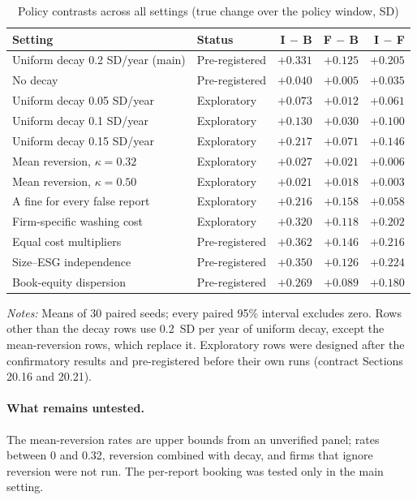 \documentclass[11pt]{article}
\begin{document}
\begin{table}[t]
\centering
\small
\begin{threeparttable}
\caption{Policy contrasts across all settings (true change over the policy window, SD)}
\label{tab:robust}
\begin{tabular}{@{}llrrr@{}}
\toprule
Setting & Status & I $-$ B & F $-$ B & I $-$ F \\
\midrule
Uniform decay 0.2 SD/year (main) & Pre-registered & $+0.331$ & $+0.125$ & $+0.205$ \\
No decay & Pre-registered & $+0.040$ & $+0.005$ & $+0.035$ \\
Uniform decay 0.05 SD/year & Exploratory & $+0.073$ & $+0.012$ & $+0.061$ \\
Uniform decay 0.1 SD/year & Exploratory & $+0.130$ & $+0.030$ & $+0.100$ \\
Uniform decay 0.15 SD/year & Exploratory & $+0.217$ & $+0.071$ & $+0.146$ \\
Mean reversion, $\kappa = 0.32$ & Exploratory & $+0.027$ & $+0.021$ & $+0.006$ \\
Mean reversion, $\kappa = 0.50$ & Exploratory & $+0.021$ & $+0.018$ & $+0.003$ \\
A fine for every false report & Exploratory & $+0.216$ & $+0.158$ & $+0.058$ \\
Firm-specific washing cost & Exploratory & $+0.320$ & $+0.118$ & $+0.202$ \\
Equal cost multipliers & Pre-registered & $+0.362$ & $+0.146$ & $+0.216$ \\
Size--ESG independence & Pre-registered & $+0.350$ & $+0.126$ & $+0.224$ \\
Book-equity dispersion & Pre-registered & $+0.269$ & $+0.089$ & $+0.180$ \\
\bottomrule
\end{tabular}
\begin{tablenotes}[flushleft]\footnotesize
\item \textit{Notes:} Means of 30 paired seeds; every paired 95\% interval excludes zero. Rows other than the decay rows use 0.2~SD per year of uniform decay, except the mean-reversion rows, which replace it. Exploratory rows were designed after the confirmatory results and pre-registered before their own runs (contract Sections 20.16 and 20.21).
\end{tablenotes}
\end{threeparttable}
\end{table}

\paragraph{What remains untested.} The mean-reversion rates are upper bounds from an unverified panel; rates between 0 and 0.32, reversion combined with decay, and firms that ignore reversion were not run. The per-report booking was tested only in the main setting.
\end{document}
